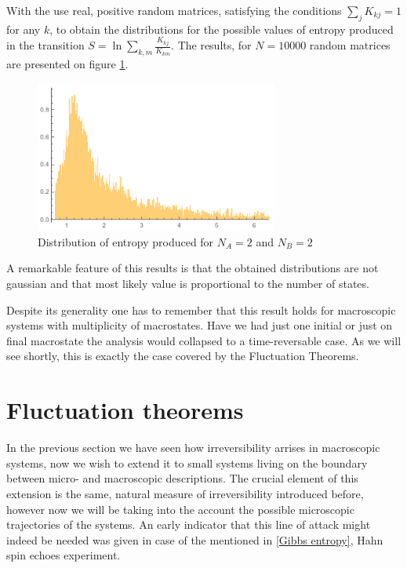 \documentclass[a4paper,12pt]{article}
\begin{document}
With the use real, positive random matrices, satisfying the conditions $\sum_j K_{kj} = 1$ for any $k$, to obtain the distributions for the possible values of entropy produced in the transition $ S = \ln{\sum_{k,m} \frac{K_{kj}}{K_{km}}} $. The results, for $N=10000$ random matrices are presented on figure \ref{Fig4}.

\begin{figure}[ht!]
\centering \includegraphics[width=8cm]{dissipation} \caption{Distribution of entropy produced for $N_A = 2$ and $N_B=2$}
\label{Fig4} 
\end{figure}

A remarkable feature of this results is that the obtained distributions are not gaussian and that most likely value is proportional to the number of states. 

Despite its generality one has to remember that this result holds for macroscopic systems with multiplicity of macrostates. Have we had just one initial or just on final macrostate the analysis would collapsed to a time-reversable case. As we will see shortly, this is exactly the case covered by the Fluctuation Theorems.

\section{Fluctuation theorems}
\label{FluctuationTheorems}
In the previous section we have seen how irreversibility arrises in macroscopic systems, now we wish to extend it to small systems living on the boundary between micro- and macroscopic descriptions. The crucial element of this extension is the same, natural measure of irreversibility introduced before, however now we will be taking into the account the possible microscopic trajectories of the systems. 
An early indicator that this line of attack might indeed be needed was given in case of the mentioned in \ref{Gibbs entropy}, Hahn spin echoes experiment.
\end{document}
